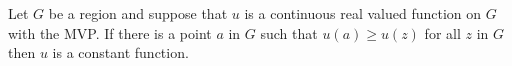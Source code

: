 Let $G$ be a region and suppose that $u$ is a continuous real valued function on $G$ with the MVP. If there is a point $a$ in $G$ such that $u(a) \geq u(z)$ for all $z$ in $G$ then $u$ is a constant function.
